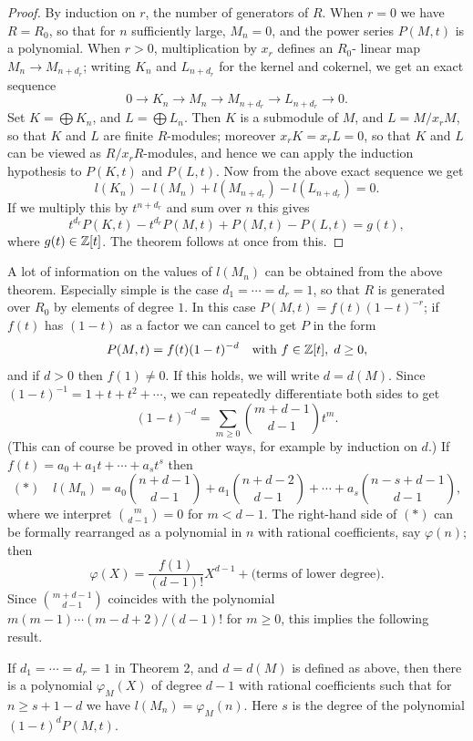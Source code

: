 \begin{proof}
By induction on $r$, the number of generators of $R$. When $r = 0$ we
have $R = R_0$, so that for $n$ sufficiently large, $M_n = 0$, and the power series
$P(M, t)$ is a polynomial. When $r > 0$, multiplication by $x_r$ defines an $R_0$-
linear map $M_n \to M_{n+d_r}$; writing $K_n$ and $L_{n+d_r}$ for the kernel and cokernel,
we get an exact sequence
\[
  0 \to K_n \to M_n \to M_{n+d_r} \to L_{n+d_r} \to 0.
\]
Set $K = \bigoplus K_n$, and $L = \bigoplus L_n$. Then $K$ is a submodule of $M$, and $L = M/x_rM$,
so that $K$ and $L$ are finite $R$-modules; moreover $x_rK = x_rL = 0$, so that $K$
and $L$ can be viewed as $R/x_rR$-modules, and hence we can apply the
induction hypothesis to $P(K, t)$ and $P(L, t)$. Now from the above exact
sequence we get
\[
  l(K_n) - l(M_n) + l(M_{n+d_r}) - l(L_{n+d_r}) = 0.
\]
If we multiply this by $t^{n+d_r}$ and sum over $n$ this gives
\[
  t^{d_r}P(K, t) - t^{d_r}P(M, t) + P(M, t) - P(L, t) = g(t),
\]
where $g(t) \in \mathbb{Z}[t]$. The theorem follows at once from this.
\end{proof}

A lot of information on the values of $l(M_n)$ can be obtained from the
above theorem. Especially simple is the case $d_1 = \cdots = d_r = 1$, so that $R$ is
generated over $R_0$ by elements of degree $1$. In this case $P(M, t) = f(t)
(1 - t)^{-r}$; if $f(t)$ has $(1 - t)$ as a factor we can cancel to get $P$ in the form
\[
  P(M, t) = f(t)(1 - t)^{-d} \quad \text{with } f \in \mathbb{Z}[t], \; d \ge 0,
\]
and if $d > 0$ then $f(1) \neq 0$.
If this holds, we will write $d = d(M)$. Since $(1 - t)^{-1} = 1 + t + t^2 + \cdots$, we can
repeatedly differentiate both sides to get
\[
  (1 - t)^{-d} = \sum_{m \ge 0} \binom{m + d - 1}{d - 1} t^m.
\]
(This can of course be proved in other ways, for example by induction on $d$.)
If $f(t) = a_0 + a_1t + \cdots + a_st^s$ then
\[
  (*) \quad l(M_n) = a_0\binom{n+d-1}{d-1} + a_1\binom{n+d-2}{d-1} + \cdots + a_s\binom{n-s+d-1}{d-1},
\]
where we interpret $\binom{m}{d-1} = 0$ for $m < d - 1$. The right-hand side of $(*)$ can be
formally rearranged as a polynomial in $n$ with rational coefficients, say $\varphi(n)$;
then
\[
  \varphi(X) = \frac{f(1)}{(d-1)!}X^{d-1} + \text{(terms of lower degree)}.
\]
Since $\binom{m + d - 1}{d-1}$ coincides with the polynomial $m(m - 1) \cdots (m - d + 2)/
(d-1)!$ for $m \ge 0$, this implies the following result.

\begin{corollary*}
If $d_1 = \cdots = d_r = 1$ in Theorem 2, and $d = d(M)$ is defined
as above, then there is a polynomial $\varphi_M(X)$ of degree $d - 1$ with rational
coefficients such that for $n \ge s + 1 - d$ we have $l(M_n) = \varphi_M(n)$. Here $s$ is the
degree of the polynomial $(1 - t)^dP(M, t)$.
\end{corollary*}

